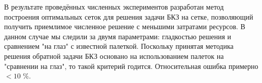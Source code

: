 В результате проведённых численных экспериментов разработан метод построения оптимальных сеток для решения задачи БКЗ на сетке, позволяющий получить приемлимое численное решение с меньшими затратами ресурсов. В данном случае мы следили за двумя параметрами: гладкостью решения и сравнением "на глаз" с известной палеткой. Поскольку принятая методика решения обратной задачи БКЗ основано на использованием палеток на "сравнении на глаз", то такой критерий годится. Относительная ошибка примерно ${<10}$ \%.

\clearpage